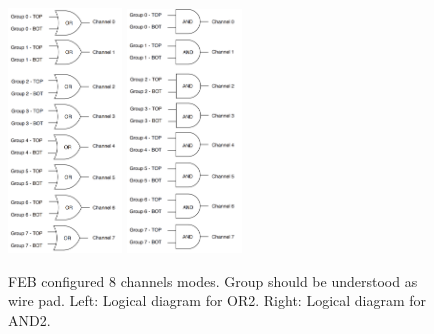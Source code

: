 \begin{figure}[!htbp]
\begin{center}
\includegraphics[width=0.27\textwidth,keepaspectratio]{figures_and_tables/rpc/mwpc/or2.png}\hspace*{1.cm}
\includegraphics[width=0.27\textwidth,keepaspectratio]{figures_and_tables/rpc/mwpc/and2.png}\hspace*{1.cm}
\end{center}\vspace*{-.5cm}
\caption{FEB configured 8 channels modes. Group should be understood as wire pad. Left: Logical diagram for OR2. Right: Logical diagram for AND2.}
\label{8channels}
\end{figure}


